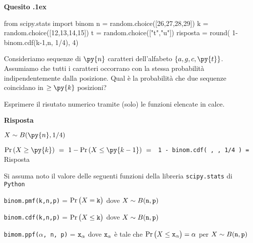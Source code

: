 \documentclass[11pt,twoside,a4paper]{article}
\newcounter{quesito}
\newenvironment{question}{\bigskip\addtocounter{quesito}{1}\bigskip\bigskip\par\textbf{Quesito \thequesito.\kern1ex}}{\vspace{\parskip}}
\newenvironment{answer}{\par\textbf{Risposta\quad}}{\vspace{\parskip}}
\begin{document}
\begin{question}
\begin{pycode}
from scipy.stats import binom
n = random.choice([26,27,28,29])
k = random.choice([12,13,14,15])
t = random.choice(["t","u"])
risposta = round( 1- binom.cdf(k-1,n, 1/4), 4)
\end{pycode}
Consideriamo sequenze di $\py{n}$ caratteri dell'alfabeto $\{a,g,c,\py{t}\}$. Assumiamo che tutti i caratteri occorrano con la stessa probabilità indipendentemente dalla posizione. Qual è la probabilità che due sequenze coincidano in $\ge\py{k}$ posizioni?  

Esprimere il risutato numerico tramite (solo) le funzioni elencate in calce. 
\begin{answer}


$X\sim B(\py{n}, 1/4)$

$\Pr(X\ge \py{k})\ =\ 1-\Pr(X\le \py{k-1})\ =\ ${\tt{\color{blue}  1 -  binom.cdf( , , 1/4 )} = }{\color{blue}\hfill Risposta}
\end{answer}
\end{question}



\vfill
\hrulefill

Si assuma noto il valore delle seguenti funzioni della libreria {\tt scipy.stats\/} di  {\tt Python\/}

{\tt binom.pmf(k,n,p)} = $\Pr\big(X={\tt k}\big)$ dove $X\sim B({\tt n},{\tt p})$ 

{\tt binom.cdf(k,n,p)} = $\Pr\big(X\le{\tt k}\big)$ dove  $X\sim B({\tt n},{\tt p})$ 

{\tt bimom.ppf($\alpha$, n, p)} = ${\tt x_\alpha}$ dove ${\tt x_\alpha}$ è tale che $\Pr\big(X\le{\tt x_\alpha}\big)=\alpha$ per $X\sim B({\tt n},{\tt p})$ 
\end{document}
